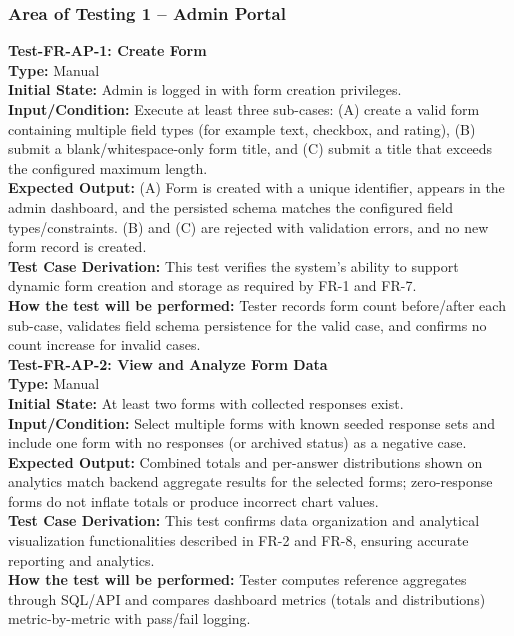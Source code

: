 \documentclass[12pt, titlepage]{article}
\begin{document}
\subsubsection{Area of Testing 1 – Admin Portal}

\noindent\textbf{Test-FR-AP-1: Create Form}\\
\textbf{Type:} Manual\\
\textbf{Initial State:} Admin is logged in with form creation privileges.\\
\textbf{Input/Condition:} Execute at least three sub-cases: (A) create a valid form containing multiple field types (for example text, checkbox, and rating), (B) submit a blank/whitespace-only form title, and (C) submit a title that exceeds the configured maximum length.\\
\textbf{Expected Output:} (A) Form is created with a unique identifier, appears in the admin dashboard, and the persisted schema matches the configured field types/constraints. (B) and (C) are rejected with validation errors, and no new form record is created.\\
\textbf{Test Case Derivation:} This test verifies the system’s ability to support dynamic form creation and storage as required by FR-1 and FR-7.\\
\textbf{How the test will be performed:} Tester records form count before/after each sub-case, validates field schema persistence for the valid case, and confirms no count increase for invalid cases.\\[6pt]

\noindent\textbf{Test-FR-AP-2: View and Analyze Form Data}\\
\textbf{Type:} Manual\\
\textbf{Initial State:} At least two forms with collected responses exist.\\
\textbf{Input/Condition:} Select multiple forms with known seeded response sets and include one form with no responses (or archived status) as a negative case.\\
\textbf{Expected Output:} Combined totals and per-answer distributions shown on analytics match backend aggregate results for the selected forms; zero-response forms do not inflate totals or produce incorrect chart values.\\
\textbf{Test Case Derivation:} This test confirms data organization and analytical visualization functionalities described in FR-2 and FR-8, ensuring accurate reporting and analytics.\\
\textbf{How the test will be performed:} Tester computes reference aggregates through SQL/API and compares dashboard metrics (totals and distributions) metric-by-metric with pass/fail logging.\\[6pt]
\end{document}
